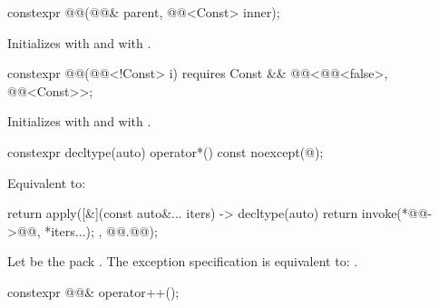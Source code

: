 %
\begin{itemdecl}
constexpr @@(@@& parent, @@<Const> inner);
\end{itemdecl}

\begin{itemdescr}
\pnum
\effects
Initializes  with  and
 with .
\end{itemdescr}

%
\begin{itemdecl}
constexpr @@(@@<!Const> i)
  requires Const && @@<@@<false>, @@<Const>>;
\end{itemdecl}

\begin{itemdescr}
\pnum
\effects
Initializes  with  and
 with .
\end{itemdescr}

%
\begin{itemdecl}
constexpr decltype(auto) operator*() const noexcept(@\seebelow@);
\end{itemdecl}

\begin{itemdescr}
\pnum
\effects
Equivalent to:
\begin{codeblock}
return apply([&](const auto&... iters) -> decltype(auto) {
  return invoke(*@@->@@, *iters...);
}, @@.@@);
\end{codeblock}

\pnum
\remarks
Let  be the pack .
The exception specification is equivalent to:
.
\end{itemdescr}

%
\begin{itemdecl}
constexpr @@& operator++();
\end{itemdecl}

